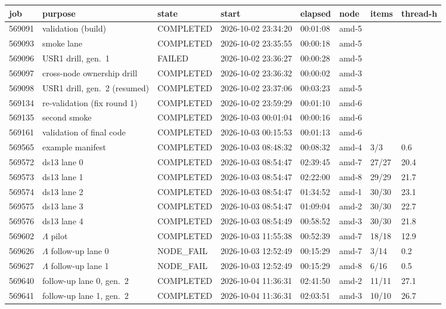 \begin{tabular}{llllllll}
\toprule
job & purpose & state & start & elapsed & node & items & thread-h\\
\midrule
569091 & validation (build) & COMPLETED & 2026-10-02 23:34:20 & 00:01:08 & amd-5 &  & \\
569093 & smoke lane & COMPLETED & 2026-10-02 23:35:55 & 00:00:18 & amd-5 &  & \\
569096 & USR1 drill, gen.~1 & FAILED & 2026-10-02 23:36:27 & 00:00:28 & amd-5 &  & \\
569097 & cross-node ownership drill & COMPLETED & 2026-10-02 23:36:32 & 00:00:02 & amd-3 &  & \\
569098 & USR1 drill, gen.~2 (resumed) & COMPLETED & 2026-10-02 23:37:06 & 00:03:23 & amd-5 &  & \\
569134 & re-validation (fix round 1) & COMPLETED & 2026-10-02 23:59:29 & 00:01:10 & amd-6 &  & \\
569135 & second smoke & COMPLETED & 2026-10-03 00:01:04 & 00:00:16 & amd-6 &  & \\
569161 & validation of final code & COMPLETED & 2026-10-03 00:15:53 & 00:01:13 & amd-6 &  & \\
569565 & example manifest & COMPLETED & 2026-10-03 08:48:32 & 00:08:32 & amd-4 & 3/3 & 0.6\\
569572 & ds13 lane 0 & COMPLETED & 2026-10-03 08:54:47 & 02:39:45 & amd-7 & 27/27 & 20.4\\
569573 & ds13 lane 1 & COMPLETED & 2026-10-03 08:54:47 & 02:22:00 & amd-8 & 29/29 & 21.7\\
569574 & ds13 lane 2 & COMPLETED & 2026-10-03 08:54:47 & 01:34:52 & amd-1 & 30/30 & 23.1\\
569575 & ds13 lane 3 & COMPLETED & 2026-10-03 08:54:47 & 01:09:04 & amd-2 & 30/30 & 22.7\\
569576 & ds13 lane 4 & COMPLETED & 2026-10-03 08:54:49 & 00:58:52 & amd-3 & 30/30 & 21.8\\
569602 & $\Lambda$ pilot & COMPLETED & 2026-10-03 11:55:38 & 00:52:39 & amd-7 & 18/18 & 12.9\\
569626 & $\Lambda$ follow-up lane 0 & NODE\_FAIL & 2026-10-03 12:52:49 & 00:15:29 & amd-7 & 3/14 & 0.2\\
569627 & $\Lambda$ follow-up lane 1 & NODE\_FAIL & 2026-10-03 12:52:49 & 00:15:29 & amd-8 & 6/16 & 0.5\\
569640 & follow-up lane 0, gen.~2 & COMPLETED & 2026-10-04 11:36:31 & 02:41:50 & amd-2 & 11/11 & 27.1\\
569641 & follow-up lane 1, gen.~2 & COMPLETED & 2026-10-04 11:36:31 & 02:03:51 & amd-3 & 10/10 & 26.7\\
\bottomrule
\end{tabular}

